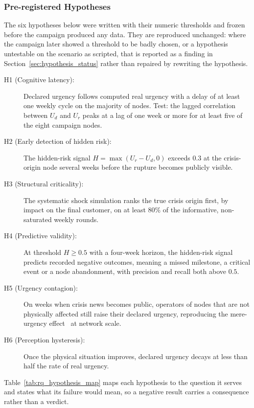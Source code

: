 \subsubsection{Pre-registered Hypotheses}
\label{sec:hypotheses}

The six hypotheses below were written with their numeric thresholds and frozen before the
campaign produced any data. They are reproduced unchanged: where the campaign later showed
a threshold to be badly chosen, or a hypothesis untestable on the scenario as scripted, that
is reported as a finding in Section~\ref{sec:hypothesis_status} rather than repaired by
rewriting the hypothesis.

\begin{description}
    \item[H1 (Cognitive latency):] Declared urgency follows computed real urgency with a
    delay of at least one weekly cycle on the majority of nodes. Test: the lagged
    correlation between $U_d$ and $U_r$ peaks at a lag of one week or more for at least
    five of the eight campaign nodes.
    \item[H2 (Early detection of hidden risk):] The hidden-risk signal
    $H = \max(U_r - U_d, 0)$ exceeds $0.3$ at the crisis-origin node several weeks before
    the rupture becomes publicly visible.
    \item[H3 (Structural criticality):] The systematic shock simulation ranks the true
    crisis origin first, by impact on the final customer, on at least 80\% of the
    informative, non-saturated weekly rounds.
    \item[H4 (Predictive validity):] At threshold $H \ge 0.5$ with a four-week horizon,
    the hidden-risk signal predicts recorded negative outcomes, meaning a missed
    milestone, a critical event or a node abandonment, with precision and recall both
    above $0.5$.
    \item[H5 (Urgency contagion):] On weeks when crisis news becomes public, operators of
    nodes that are not physically affected still raise their declared urgency,
    reproducing the mere-urgency effect~\autocite{zhu2018mere} at network scale.
    \item[H6 (Perception hysteresis):] Once the physical situation improves, declared
    urgency decays at less than half the rate of real urgency.
\end{description}

Table~\ref{tab:rq_hypothesis_map} maps each hypothesis to the question it serves and states
what its failure would mean, so a negative result carries a consequence rather than a
verdict.

